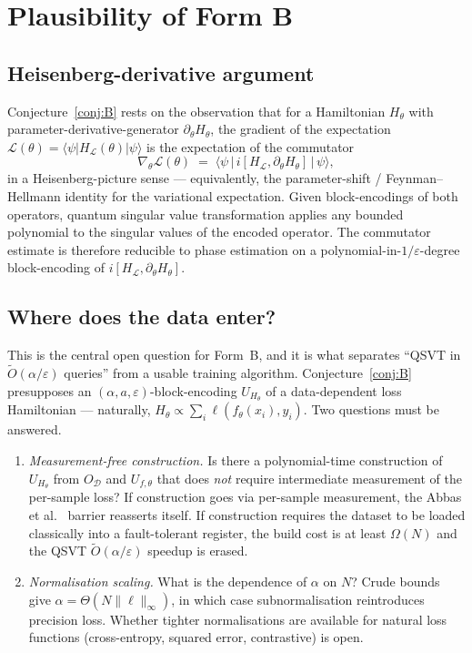 \documentclass[11pt,a4paper]{article}
\theoremstyle{definition}
\newcommand{\Otil}{\widetilde{O}}
\newcommand{\veps}{\varepsilon}
\newcommand{\loss}{\mathcal{L}}
\newcommand{\Dset}{\mathcal{D}}
\begin{document}
\section{Plausibility of Form B}\label{sec:formB}

\subsection{Heisenberg-derivative argument}

Conjecture~\ref{conj:B} rests on the observation that for a Hamiltonian $H_\theta$ with parameter-derivative-generator $\partial_\theta H_\theta$, the gradient of the expectation $\loss(\theta) = \langle\psi|H_\loss(\theta)|\psi\rangle$ is the expectation of the commutator
\[
\nabla_\theta \loss(\theta) \;=\; \langle\psi\,|\,i[H_\loss, \partial_\theta H_\theta]\,|\,\psi\rangle,
\]
in a Heisenberg-picture sense --- equivalently, the parameter-shift / Feynman--Hellmann identity for the variational expectation. Given block-encodings of both operators, quantum singular value transformation \cite{GSLW2019} applies any bounded polynomial to the singular values of the encoded operator. The commutator estimate is therefore reducible to phase estimation on a polynomial-in-$1/\veps$-degree block-encoding of $i[H_\loss, \partial_\theta H_\theta]$.

\subsection{Where does the data enter?}\label{sec:formB-data}

This is the central open question for Form~B, and it is what separates ``QSVT in $\Otil(\alpha/\veps)$ queries'' from a usable training algorithm. Conjecture~\ref{conj:B} presupposes an $(\alpha, a, \veps)$-block-encoding $U_{H_\theta}$ of a data-dependent loss Hamiltonian --- naturally, $H_\theta \propto \sum_i \ell(f_\theta(x_i), y_i)$. Two questions must be answered.

\begin{enumerate}[label=(D\arabic*),itemsep=2pt]
\item \emph{Measurement-free construction.} Is there a polynomial-time construction of $U_{H_\theta}$ from $O_\Dset$ and $U_{f,\theta}$ that does \emph{not} require intermediate measurement of the per-sample loss? If construction goes via per-sample measurement, the Abbas et al.~\cite{AbbasEtAl2023} barrier reasserts itself. If construction requires the dataset to be loaded classically into a fault-tolerant register, the build cost is at least $\Omega(N)$ and the QSVT $\Otil(\alpha/\veps)$ speedup is erased.
\item \emph{Normalisation scaling.} What is the dependence of $\alpha$ on $N$? Crude bounds give $\alpha = \Theta(N \|\ell\|_\infty)$, in which case subnormalisation reintroduces precision loss. Whether tighter normalisations are available for natural loss functions (cross-entropy, squared error, contrastive) is open.
\end{enumerate}
\end{document}
